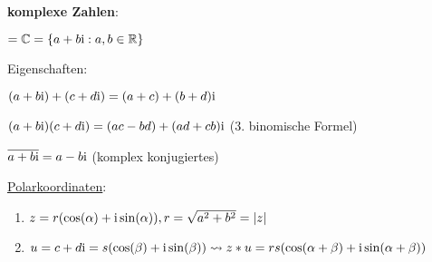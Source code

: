   \textbf{komplexe Zahlen}:
  \begin{items}
    \item $= \mathbb{C} = \{ a+b\text{i} : a,b \in \mathbb{R} \}$
    \item Eigenschaften:
    \begin{enumeration}
      \item $(a+b\text{i})+(c+d\text{i}) = (a+c)+(b+d)\text{i}$
      \item $(a+b\text{i})(c+d\text{i}) = (ac-bd)+(ad+cb)\text{i}$ ($3$. binomische Formel)
      \item $\overline{a+b\text{i}}=a-b\text{i}$ (komplex konjugiertes)
    \end{enumeration}
    \item \underline{Polarkoordinaten}:
    \begin{enumerate}
      \item $z=r(\cos(\alpha)+\text{i} \sin(\alpha)), r=\sqrt{a^2+b^2}=|z|$
      \item $u=c+d\text{i}=s(\cos(\beta)+\text{i} \sin(\beta))\\* \leadsto z*u=rs(\cos(\alpha+\beta)+\text{i} \sin(\alpha+\beta))$ 
    \end{enumerate}
  \end{items}

